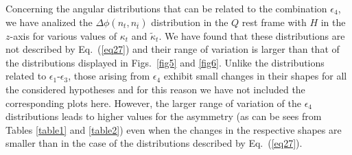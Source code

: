\documentclass[aps,preprint,tightenlines,floatfix,superscriptaddress,nofootinbib,showpacs]{revtex4-1}
\def\tbar{\bar{t}}
\def\kp{\kappa_t}
\def\kpt{\tilde{\kappa}_t}
\begin{document}
\par Concerning the angular distributions that can be related to the
combination $\epsilon_4$, we have analized the
$\Delta\phi(n_t,n_{\tbar})$ distribution in the $Q$ rest frame with
$H$ in the $z$-axis for various values of $\kp$ and $\kpt$. We have
found that these distributions are not described by Eq.~(\ref{eq27})
and their range of variation is larger than that of the distributions
displayed in Figs.~\ref{fig5} and \ref{fig6}. Unlike the distributions
related to $\epsilon_1$-$\epsilon_3$, those arising from $\epsilon_4$
exhibit small changes in their shapes for all the considered
hypotheses and for this reason we have not included the corresponding
plots here. However, the larger range of variation of the $\epsilon_4$
distributions leads to higher values for the asymmetry (as can be sees
from Tables \ref{table1} and \ref{table2}) even when the changes in
the respective shapes are smaller than in the case of the
distributions described by Eq.~(\ref{eq27}).  \par
\end{document}
